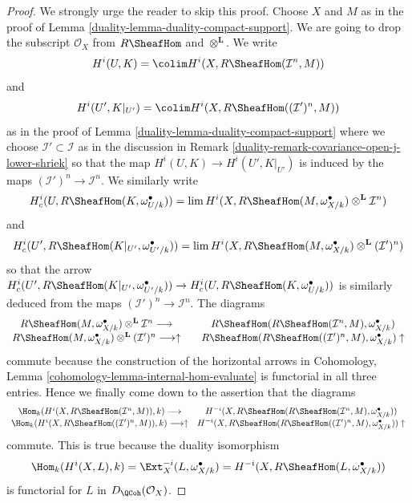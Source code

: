 \begin{proof}

We strongly urge the reader to skip this proof. Choose $X$ and $M$ as
in the proof of Lemma \ref{duality-lemma-duality-compact-support}. We are going to drop
the subscript $\mathcal{O}_X$ from $R\SheafHom$ and $\otimes^\mathbf{L}$.
We write
$$
H^i(U, K) = \colim H^i(X, R\SheafHom(\mathcal{I}^n, M))
$$
and
$$
H^i(U', K|_{U'}) = \colim H^i(X, R\SheafHom((\mathcal{I}')^n, M))
$$
as in the proof of Lemma \ref{duality-lemma-duality-compact-support} where we choose
$\mathcal{I}' \subset \mathcal{I}$ as in the discussion in
Remark \ref{duality-remark-covariance-open-j-lower-shriek} so that the map
$H^i(U, K) \to H^i(U', K|_{U'})$ is induced by the maps
$(\mathcal{I}')^n \to \mathcal{I}^n$.
We similarly write
$$
H^i_c(U, R\SheafHom(K, \omega_{U/k}^\bullet)) =
\lim H^i(X,  R\SheafHom(M, \omega_{X/k}^\bullet)
\otimes^\mathbf{L} \mathcal{I}^n)
$$
and
$$
H^i_c(U', R\SheafHom(K|_{U'}, \omega_{U'/k}^\bullet)) =
\lim H^i(X,  R\SheafHom(M, \omega_{X/k}^\bullet)
\otimes^\mathbf{L} (\mathcal{I}')^n)
$$
so that the arrow $H^i_c(U', R\SheafHom(K|_{U'}, \omega_{U'/k}^\bullet))
\to H^i_c(U, R\SheafHom(K, \omega_{U/k}^\bullet))$ is similarly
deduced from the maps $(\mathcal{I}')^n \to \mathcal{I}^n$.
The diagrams
$$
\begin{array}{ccc}R\SheafHom(M, \omega_{X/k}^\bullet)
\otimes^\mathbf{L} \mathcal{I}^n
\longrightarrow &  & R\SheafHom(R\SheafHom(\mathcal{I}^n, M), \omega_{X/k}^\bullet) \\ R\SheafHom(M, \omega_{X/k}^\bullet) \otimes^\mathbf{L} (\mathcal{I}')^n
\longrightarrow\uparrow &  & R\SheafHom(R\SheafHom((\mathcal{I}')^n, M), \omega_{X/k}^\bullet) \uparrow\end{array}
$$
commute because the construction of the horizontal arrows in
Cohomology, Lemma \ref{cohomology-lemma-internal-hom-evaluate}
is functorial in all three entries. Hence we finally come down
to the assertion that the diagrams
$$
\begin{array}{cc}\Hom_k(H^i(X, R\SheafHom(\mathcal{I}^n, M)), k) \longrightarrow & H^{-i}(X, R\SheafHom(R\SheafHom(
\mathcal{I}^n, M), \omega_{X/k}^\bullet)) \\ \Hom_k(H^i(X, R\SheafHom((\mathcal{I}')^n, M)), k) \longrightarrow\uparrow & H^{-i}(X, R\SheafHom(R\SheafHom(
(\mathcal{I}')^n, M), \omega_{X/k}^\bullet)) \uparrow\end{array}
$$
commute. This is true because the duality isomorphism
$$
\Hom_k(H^i(X, L), k) = \Ext^{-i}_X(L, \omega_{X/k}^\bullet) =
H^{-i}(X, R\SheafHom(L, \omega_{X/k}^\bullet))
$$
is functorial for $L$ in $D_\QCoh(\mathcal{O}_X)$.
\end{proof}

